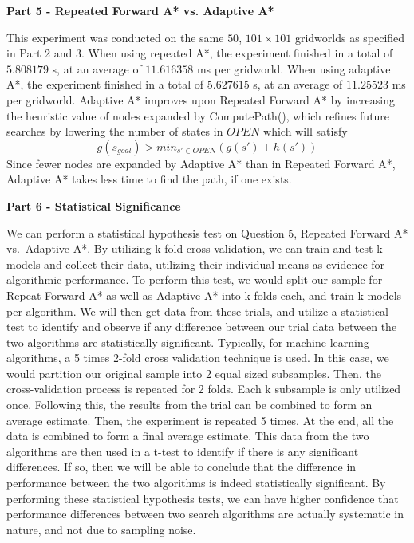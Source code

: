 \documentclass[11pt]{article}
\begin{document}
    \begin{center}
        \Large
        \textbf{Part 5 - Repeated Forward A* vs. Adaptive A*}
    \end{center}
    \normalsize
    This experiment was conducted on the same $50$, $101 \times 101$ gridworlds as specified in Part 2 and 3.
    When using repeated A*, the experiment finished in a total of $5.808179$ s, at an average of $11.616358$ ms per gridworld.
    When using adaptive A*, the experiment finished in a total of $5.627615$ s, at an average of $11.25523$ ms per gridworld.
    \newline\newline
    Adaptive A* improves upon Repeated Forward A* by increasing the heuristic value of nodes expanded by ComputePath(), which refines
    future searches by lowering the number of states in $OPEN$ which will satisfy \[g(s_{goal}) > min_{s'\in OPEN}\left(g(s') + h(s')\right)\]
    Since fewer nodes are expanded by Adaptive A* than in Repeated Forward A*, Adaptive A* takes less time to find the path, if one exists.

    \begin{center}
        \Large
        \textbf{Part 6 - Statistical Significance}
    \end{center}
    \normalsize
    We can perform a statistical hypothesis test on Question 5, Repeated Forward A* vs.\ Adaptive A*.
    By utilizing k-fold cross validation, we can train and test k models and collect their data,
    utilizing their individual means as evidence for algorithmic performance.
    To perform this test, we would split our sample for Repeat Forward A* as well as Adaptive A*
    into k-folds each, and train k models per algorithm.
    We will then get data from these trials, and utilize a statistical test to identify and observe if any difference between our trial data
    between the two algorithms are statistically significant.
    Typically, for machine learning algorithms,
    a 5 times 2-fold cross validation technique is used.
    In this case, we would partition our original sample into 2 equal sized subsamples.
    Then, the cross-validation process is repeated for 2 folds.
    Each k subsample is only utilized once.
    Following this, the results from the trial can be combined to form an average estimate.
    Then, the experiment is repeated 5 times.
    At the end, all the data is combined to form a final average estimate.
    This data from the two algorithms are then used in a t-test to identify if there is any significant differences.
    If so, then we will be able to conclude that the difference in performance between the two algorithms is indeed statistically significant.
    By performing these statistical hypothesis tests, we can have higher confidence that performance differences between two search algorithms
    are actually systematic in nature, and not due to sampling noise.
    
    
\end{document}
